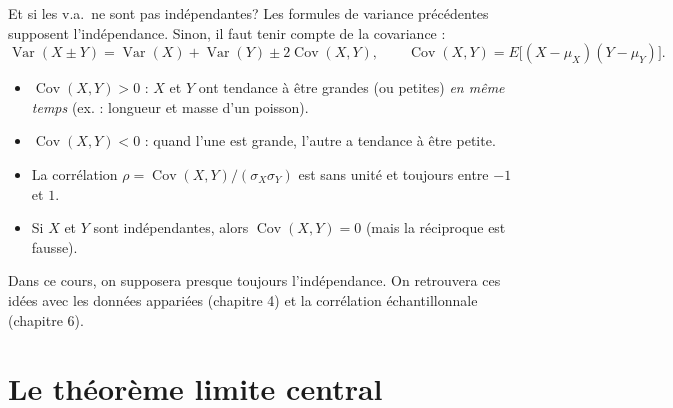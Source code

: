 \documentclass{BeamerTemplate}
\begin{document}
\begin{frame}[t]{Et si les v.a.\ ne sont pas indépendantes?}
  Les formules de variance précédentes supposent l'\alert{indépendance}. Sinon,
  il faut tenir compte de la \alert{covariance} :
  \[
    \operatorname{Var}(X \pm Y) = \operatorname{Var}(X) + \operatorname{Var}(Y)
    \pm 2\operatorname{Cov}(X, Y),
    \qquad \operatorname{Cov}(X, Y) = E\big[(X - \mu_X)(Y - \mu_Y)\big].
  \]
  \vspace{-2mm}
  \begin{itemize}\itemsep 1.5mm\small
    \item $\operatorname{Cov}(X, Y) > 0$ : $X$ et $Y$ ont tendance à être
      grandes (ou petites) \emph{en même temps} (ex. : longueur et masse d'un
      poisson).
    \item $\operatorname{Cov}(X, Y) < 0$ : quand l'une est grande, l'autre a
      tendance à être petite.
    \item La \alert{corrélation}
      $\rho = \operatorname{Cov}(X, Y) / (\sigma_X \sigma_Y)$ est sans unité et
      toujours entre $-1$ et $1$.
    \item Si $X$ et $Y$ sont indépendantes, alors $\operatorname{Cov}(X, Y) = 0$
      (mais la réciproque est fausse).
  \end{itemize}

  \medskip
  {\small\color{gray} Dans ce cours, on supposera presque toujours
  l'indépendance. On retrouvera ces idées avec les données appariées
  (chapitre 4) et la corrélation échantillonnale (chapitre 6).}
\end{frame}

\section[TLC]{Le théorème limite central}
\end{document}
